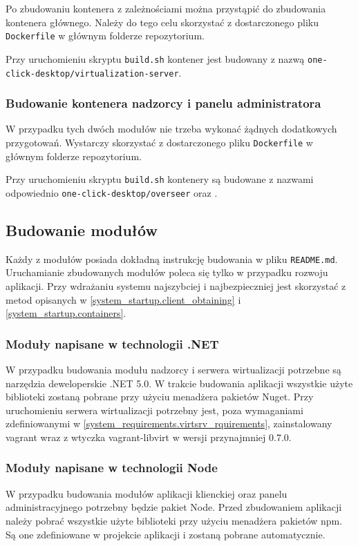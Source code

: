 \documentclass[../opis-rozwiazania.tex]{subfiles}
\begin{document}
Po zbudowaniu kontenera z zależnościami można przystąpić do zbudowania kontenera głównego.
Należy do tego celu skorzystać z dostarczonego pliku \texttt{Dockerfile} w głównym folderze repozytorium.

Przy uruchomieniu skryptu \texttt{build.sh} kontener jest budowany z nazwą \texttt{one-click-desktop/virtualization-server}.

\subsubsection{Budowanie kontenera nadzorcy i panelu administratora}
W przypadku tych dwóch modułów nie trzeba wykonać żądnych dodatkowych przygotowań.
Wystarczy skorzystać z dostarczonego pliku \texttt{Dockerfile} w głównym folderze repozytorium.

Przy uruchomieniu skryptu \texttt{build.sh} kontenery są budowane z nazwami odpowiednio \texttt{one-click-desktop/overseer} oraz \texttt{}.

\subsection{Budowanie modułów}
Każdy z modułów posiada dokładną instrukcję budowania w pliku \texttt{README.md}.
Uruchamianie zbudowanych modułów poleca się tylko w przypadku rozwoju aplikacji.
Przy wdrażaniu systemu najszybciej i najbezpieczniej jest skorzystać z metod opisanych w \ref{system_startup.client_obtaining} i \ref{system_startup.containers}.

\subsubsection{Moduły napisane w technologii .NET}
W przypadku budowania modułu nadzorcy i serwera wirtualizacji potrzebne są narzędzia deweloperskie .NET 5.0.
W trakcie budowania aplikacji wszystkie użyte biblioteki zostaną pobrane przy użyciu menadżera pakietów Nuget.
Przy uruchomieniu serwera wirtualizacji potrzebny jest, poza wymaganiami zdefiniowanymi w \ref{system_requirements.virtsrv_rquirements}, zainstalowany vagrant wraz z wtyczka vagrant-libvirt w wersji przynajmniej 0.7.0.

\subsubsection{Moduły napisane w technologii Node}
W przypadku budowania modułów aplikacji klienckiej oraz panelu administracyjnego potrzebny będzie pakiet Node.
Przed zbudowaniem aplikacji należy pobrać wszystkie użyte biblioteki przy użyciu menadżera pakietów npm.
Są one zdefiniowane w projekcie aplikacji i zostaną pobrane automatycznie.
\end{document}
